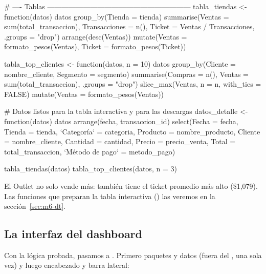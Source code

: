 \begin{rcode}
# ---- Tablas ------------------------------------------------------------
tabla_tiendas <- function(datos) {
  datos %
    group_by(Tienda = tienda) %
    summarise(Ventas = sum(total_transaccion),
              Transacciones = n(),
              Ticket = Ventas / Transacciones, .groups = "drop") %
    arrange(desc(Ventas)) %
    mutate(Ventas = formato_pesos(Ventas), Ticket = formato_pesos(Ticket))
}

tabla_top_clientes <- function(datos, n = 10) {
  datos %
    group_by(Cliente = nombre_cliente, Segmento = segmento) %
    summarise(Compras = n(), Ventas = sum(total_transaccion),
              .groups = "drop") %
    slice_max(Ventas, n = n, with_ties = FALSE) %
    mutate(Ventas = formato_pesos(Ventas))
}

# Datos listos para la tabla interactiva y para las descargas
datos_detalle <- function(datos) {
  datos %
    arrange(fecha, transaccion_id) %
    select(Fecha = fecha, Tienda = tienda, `Categoría` = categoria,
           Producto = nombre_producto, Cliente = nombre_cliente,
           Cantidad = cantidad, Precio = precio_venta,
           Total = total_transaccion, `Método de pago` = metodo_pago)
}

tabla_tiendas(datos) %
tabla_top_clientes(datos, n = 3)
\end{rcode}

El Outlet no solo vende más: también tiene el ticket promedio más alto
(\$1,079). Las funciones que preparan la tabla interactiva
() las veremos en la
sección~\ref{sec:m6-dt}.

\subsection{La interfaz del dashboard}

Con la lógica probada, pasamos a . Primero paquetes y datos
(fuera del , una sola vez) y luego encabezado y barra
lateral:

